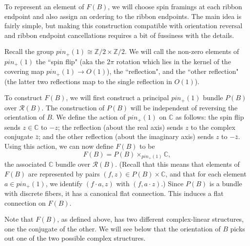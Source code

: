\documentclass[12pt,a4paper]{article}
\newcommand{\zz}{\mathbb{Z}}
\newcommand{\cc}{\mathbb{C}}
\newcommand{\mcr}{\mathcal{R}}
\newcommand\be            {\begin{equation}}
\newcommand\ee            {\end{equation}}
\newcommand{\kw}[1]{{\color{kwcolor}\footnotesize{(KW) #1}}}
\begin{document}
\medskip

To represent an element of $F(B)$, we will choose spin framings at each ribbon endpoint and also assign
an ordering to the ribbon endpoints.
The main idea is fairly simple, but making this construction compatible with orientation reversal
and ribbon endpoint cancellations requires a bit of fussiness with the details.

\medskip

Recall the group $pin_+(1) \cong \zz/2 \times \zz/2$.
We will call the non-zero elements of $pin_+(1)$ the ``spin flip" (aka the $2\pi$ rotation which lies in the kernel of the covering map
$pin_+(1) \to O(1)$), the ``reflection", and the ``other reflection"
(the latter two reflections map to the single reflection in $O(1)$).

To construct $F(B)$, we will first construct a principal $pin_+(1)$ bundle $P(B)$ over $\mcr(B)$.
The construction of $P(B)$ will be independent of reversing the orientation of $B$.
We define the action of $pin_+(1)$ on $\cc$ as follows:
the spin flip sends $z\in \cc$ to $-z$;
the reflection (about the real axis) sends $z$ to the complex conjugate $\bar z$;
and the other reflection (about the imaginary axis) sends $z$ to $-\bar z$.
Using this action, we can now define $F(B)$ to be
\be \label{fermbundef}
	F(B) = P(B) \times_{pin_+(1)} \cc ,
\ee
the associated $\cc$ bundle over $\mcr(B)$.
(Recall that this means that elements of $F(B)$ are represented by pairs $(f, z) \in P(B) \times \cc$,
and that for each element $a \in pin_+(1)$, we identify $(f\cdot a, z)$ with $(f, a \cdot z)$.)
Since $P(B)$ is a bundle with discrete fibers, it has a canonical flat connection.
This induces a flat connection on $F(B)$.

Note that $F(B)$, as defined above, has two different complex-linear structures, one the conjugate of the other.
We will see below that the orientation of $B$ picks out one of the two possible complex structures.

\medskip
\end{document}
